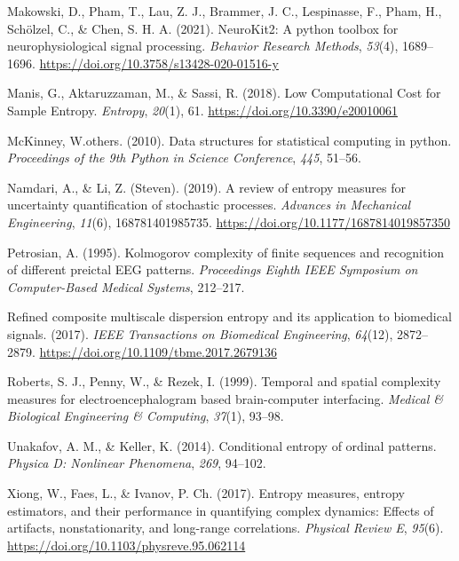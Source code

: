 \documentclass[
  man]{apa6}
\newlength{\cslhangindent}
\newlength{\cslentryspacingunit} %
\newenvironment{CSLReferences}[2] %
 {%
  \setlength{\parindent}{0pt}
  \ifodd #1
  \let\oldpar\par
  \def\par{\hangindent=\cslhangindent\oldpar}
  \fi
  \setlength{\parskip}{#2\cslentryspacingunit}
 }%
 {}
\begin{document}
\begin{CSLReferences}{1}{0}
\leavevmode{}%
Makowski, D., Pham, T., Lau, Z. J., Brammer, J. C., Lespinasse, F., Pham, H., Schölzel, C., \& Chen, S. H. A. (2021). {NeuroKit}2: A python toolbox for neurophysiological signal processing. \emph{Behavior Research Methods}, \emph{53}(4), 1689--1696. \url{https://doi.org/10.3758/s13428-020-01516-y}

\leavevmode{}%
Manis, G., Aktaruzzaman, M., \& Sassi, R. (2018). Low Computational Cost for Sample Entropy. \emph{Entropy}, \emph{20}(1), 61. \url{https://doi.org/10.3390/e20010061}

\leavevmode{}%
McKinney, W.others. (2010). Data structures for statistical computing in python. \emph{Proceedings of the 9th Python in Science Conference}, \emph{445}, 51--56.

\leavevmode{}%
Namdari, A., \& Li, Z. (Steven). (2019). A review of entropy measures for uncertainty quantification of stochastic processes. \emph{Advances in Mechanical Engineering}, \emph{11}(6), 168781401985735. \url{https://doi.org/10.1177/1687814019857350}

\leavevmode{}%
Petrosian, A. (1995). Kolmogorov complexity of finite sequences and recognition of different preictal EEG patterns. \emph{Proceedings Eighth IEEE Symposium on Computer-Based Medical Systems}, 212--217.

\leavevmode{}%
Refined composite multiscale dispersion entropy and its application to biomedical signals. (2017). \emph{IEEE Transactions on Biomedical Engineering}, \emph{64}(12), 2872--2879. \url{https://doi.org/10.1109/tbme.2017.2679136}

\leavevmode{}%
Roberts, S. J., Penny, W., \& Rezek, I. (1999). Temporal and spatial complexity measures for electroencephalogram based brain-computer interfacing. \emph{Medical \& Biological Engineering \& Computing}, \emph{37}(1), 93--98.

\leavevmode{}%
Unakafov, A. M., \& Keller, K. (2014). Conditional entropy of ordinal patterns. \emph{Physica D: Nonlinear Phenomena}, \emph{269}, 94--102.

\leavevmode{}%
Xiong, W., Faes, L., \& Ivanov, P. Ch. (2017). Entropy measures, entropy estimators, and their performance in quantifying complex dynamics: Effects of artifacts, nonstationarity, and long-range correlations. \emph{Physical Review E}, \emph{95}(6). \url{https://doi.org/10.1103/physreve.95.062114}


\end{CSLReferences}
\end{document}
